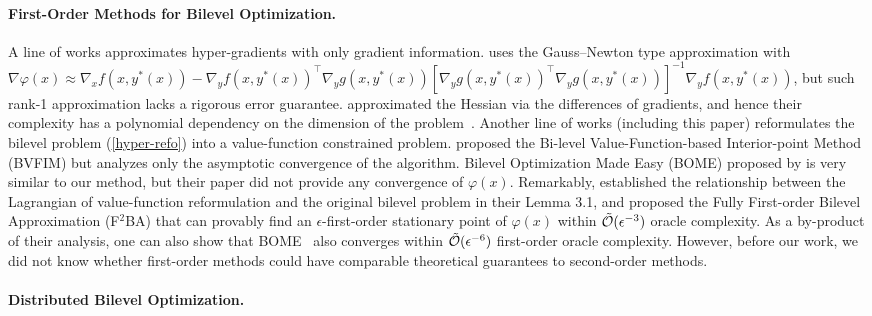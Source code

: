 \documentclass{article}
\begin{document}
\paragraph{First-Order Methods for Bilevel Optimization.}

A line of works approximates hyper-gradients with only gradient information.
\citet{giovannelli2021bilevel} uses 
the Gauss–Newton type approximation with $ \nabla \varphi(x) \approx \nabla_x f(x,y^*(x)) - \nabla_y f(x,y^*(x))^\top \nabla_y g(x,y^*(x)) [\nabla_y g(x,y^*(x))^\top \nabla_y g(x,y^*(x)) ]^{-1} \nabla_y f(x,y^*(x)) $, but such rank-1 approximation lacks a rigorous error guarantee. 
\citet{sow2022convergence} approximated the Hessian via the differences of gradients, and hence their complexity has a polynomial 
dependency on the dimension of the problem~\cite{duchi2015optimal}. Another line of works (including this paper) reformulates the bilevel problem (\ref{hyper-refo}) into a value-function constrained problem. \citet{liu2021value} proposed 
the Bi-level Value-Function-based Interior-point Method (BVFIM) but analyzes only the asymptotic convergence of the algorithm. 
Bilevel Optimization Made Easy (BOME) proposed by
\citet{liu2022bome} is very similar to our method, but their paper did not provide any convergence of $\varphi(x)$. Remarkably, \citet{kwon2023fully}
established
the relationship between the Lagrangian of value-function reformulation and the original bilevel problem in their Lemma 3.1, and proposed the Fully First-order Bilevel Approximation (F${}^2$BA) that can provably find an $\epsilon$-first-order stationary point of $\varphi(x)$ within $\tilde {{\mathcal{O}}}(\epsilon^{-3})$ oracle complexity. As a by-product of their analysis, one can also show that BOME~\cite{liu2022bome} also converges within $\tilde {{\mathcal{O}}}(\epsilon^{-6})$ first-order oracle complexity. 
However, before our work, we did not know whether first-order methods could have comparable theoretical guarantees to second-order methods.

\paragraph{Distributed Bilevel Optimization.}
\end{document}

